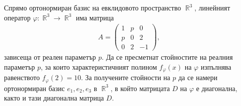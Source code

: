\documentclass{../../common/topic}
\begin{document}
\begin{problem}
  Спрямо ортонормиран базис на евклидовото пространство \( \BbbR^3 \), линейният оператор \( \varphi: \BbbR^3 \to \BbbR^3 \) има матрица
  \begin{align*}
    A = \begin{pmatrix}
      1 & p & 0 \\
      p & 0 & 2 \\
      0 & 2 & -1
    \end{pmatrix},
  \end{align*}
  зависеща от реален параметър \( p \). Да се пресметнат стойностите на реалния параметър \( p \), за които характеристичният полином \( f_\varphi(x) \) на \( \varphi \) изпълнява равенството \( f_\varphi(2) = 10 \). За получените стойности на \( p \) да се намери ортонормиран базис \( e_1, e_2, e_3 \) в \( \BbbR^3 \), в който матрицата \( D \) на \( \varphi \) е диагонална, както и тази диагонална матрица \( D \).
\end{problem}
\end{document}
